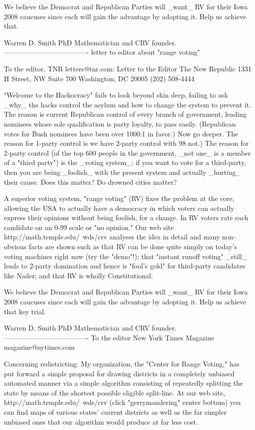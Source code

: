 We believe the Democrat and Republican Parties will _want_ RV for their Iowa 2008
caucuses since each will gain the advantage by adopting it.  Help us achieve that.

Warren D. Smith
PhD Mathematician and CRV founder.
-------------------------------------
letter to editor about "range voting"

To the editor, TNR  letters@tnr.com:
Letter to the Editor
The New Republic
1331 H Street, NW Suite 700 
Washington, DC 20005
(202) 508-4444

"Welcome to the Hackocracy"
fails to look beyond skin deep, failing to ask _why_ the hacks control the asylum
and how to change the system to prevent it.  The reason is current Republican control of every
branch of government, leading nominees whose sole qualification is party loyalty,
to pass easily.  (Republican votes for Bush nominees have been over 1000:1 in favor.)
Now go deeper.  The reason for 1-party control is we have 2-party control with
98%
not.)  The reason for 2-party control (of the top 600 people in the government, _not one_ 
is a member of a "third party") is the _voting system_:  if you want to vote for
a third-party, then you are being _foolish_ with the present system and actually _hurting_ their
cause.  Does this matter?  Do drowned cities matter?

A superior voting system, "range voting" (RV) fixes the problem at the core,
allowing the USA to actually have a democracy in which voters can actually express 
their opinions without being foolish, for a change.  
In RV voters rate each candidate on an 0-99 scale or 
"no opinion."  Our web site
   http://math.temple.edu/~wds/crv
analyses the idea in detail and many non-obvious facts are shown such as
that RV can be done quite simply on today's voting machines right now (try the "demo"!);
that "instant runoff voting"  _still_ leads to 2-party domination and hence
is "fool's gold" for third-party candidates like Nader; and that
RV is wholly Constitutional.

We believe the Democrat and Republican Parties will _want_ RV for their Iowa 2008
caucuses since each will gain the advantage by adopting it.  Help us achieve that 
key trial.

Warren D. Smith
PhD Mathematician and CRV founder.
-------------------------------------
To the editor
New York Times Magazine
magazine@nytimes.com

Concerning redistricting:
My organization, the "Center for Range Voting,"
has put forward a simple proposal for drawing districts in
a completely unbiased automated manner via a simple algorithm 
consisting of repeatedly splitting the state 
by means of the shortest possible eligible split-line.  
At our web site, http://math.temple.edu/~wds/crv (click "gerrymandering" center bottom)
you can find maps of various states' current districts as well as the far simpler
unbiased ones that our algorithm would produce at far less cost.

